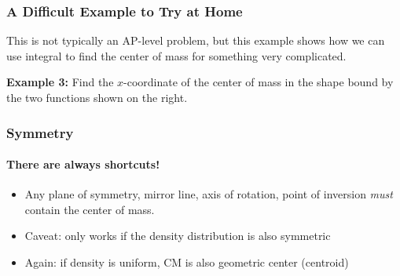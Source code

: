 \documentclass[12pt,compress,aspectratio=169]{beamer}
\begin{document}
\begin{frame}
  \frametitle{A Difficult Example to Try at Home}
  This is not typically an AP-level problem, but this example shows how we
  can use integral to find the center of mass for something very complicated.
  \begin{minipage}{0.58\textwidth}
    \textbf{Example 3:} Find the $x$-coordinate of the center of mass in the
    shape bound by the two functions shown on the right.
  \end{minipage}
  \begin{minipage}{0.4\textwidth}
    \begin{center}
    \end{center}
  \end{minipage}
\end{frame}

\begin{frame}
  \frametitle{Symmetry}
  \framesubtitle{There are always shortcuts!}
  \begin{itemize}
  \item Any plane of symmetry, mirror line, axis of rotation, point of inversion
    \emph{must} contain the center of mass.
  \item Caveat: only works if the density distribution is also symmetric
  \item Again: if density is uniform, CM is also geometric center (centroid)
  \end{itemize}
\end{frame}
\end{document}
